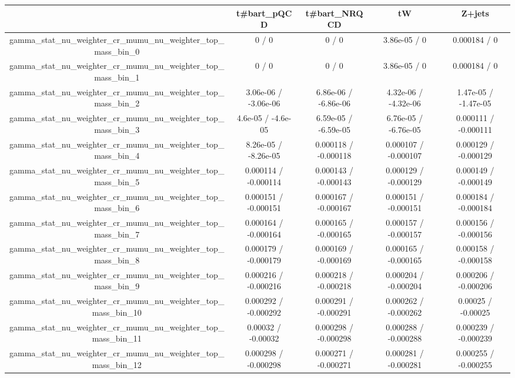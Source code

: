 \documentclass[10pt]{article}
\begin{document}
\begin{table}[htbp]
\begin{center}
\begin{tabular}{|c|c|c|c|c|}
\hline 
      & t#bar{t}_{pQCD}      & t#bar{t}_{NRQCD}      & tW      & Z+jets \\ 
\hline 
  gamma_stat_nu_weighter_cr_mumu_nu_weighter_top_mass_bin_0 & 0 / 0 & 0 / 0 & 3.86e-05 / 0 & 0.000184 / 0 \\ 
  gamma_stat_nu_weighter_cr_mumu_nu_weighter_top_mass_bin_1 & 0 / 0 & 0 / 0 & 3.86e-05 / 0 & 0.000184 / 0 \\ 
  gamma_stat_nu_weighter_cr_mumu_nu_weighter_top_mass_bin_2 & 3.06e-06 / -3.06e-06 & 6.86e-06 / -6.86e-06 & 4.32e-06 / -4.32e-06 & 1.47e-05 / -1.47e-05 \\ 
  gamma_stat_nu_weighter_cr_mumu_nu_weighter_top_mass_bin_3 & 4.6e-05 / -4.6e-05 & 6.59e-05 / -6.59e-05 & 6.76e-05 / -6.76e-05 & 0.000111 / -0.000111 \\ 
  gamma_stat_nu_weighter_cr_mumu_nu_weighter_top_mass_bin_4 & 8.26e-05 / -8.26e-05 & 0.000118 / -0.000118 & 0.000107 / -0.000107 & 0.000129 / -0.000129 \\ 
  gamma_stat_nu_weighter_cr_mumu_nu_weighter_top_mass_bin_5 & 0.000114 / -0.000114 & 0.000143 / -0.000143 & 0.000129 / -0.000129 & 0.000149 / -0.000149 \\ 
  gamma_stat_nu_weighter_cr_mumu_nu_weighter_top_mass_bin_6 & 0.000151 / -0.000151 & 0.000167 / -0.000167 & 0.000151 / -0.000151 & 0.000184 / -0.000184 \\ 
  gamma_stat_nu_weighter_cr_mumu_nu_weighter_top_mass_bin_7 & 0.000164 / -0.000164 & 0.000165 / -0.000165 & 0.000157 / -0.000157 & 0.000156 / -0.000156 \\ 
  gamma_stat_nu_weighter_cr_mumu_nu_weighter_top_mass_bin_8 & 0.000179 / -0.000179 & 0.000169 / -0.000169 & 0.000165 / -0.000165 & 0.000158 / -0.000158 \\ 
  gamma_stat_nu_weighter_cr_mumu_nu_weighter_top_mass_bin_9 & 0.000216 / -0.000216 & 0.000218 / -0.000218 & 0.000204 / -0.000204 & 0.000206 / -0.000206 \\ 
  gamma_stat_nu_weighter_cr_mumu_nu_weighter_top_mass_bin_10 & 0.000292 / -0.000292 & 0.000291 / -0.000291 & 0.000262 / -0.000262 & 0.00025 / -0.00025 \\ 
  gamma_stat_nu_weighter_cr_mumu_nu_weighter_top_mass_bin_11 & 0.00032 / -0.00032 & 0.000298 / -0.000298 & 0.000288 / -0.000288 & 0.000239 / -0.000239 \\ 
  gamma_stat_nu_weighter_cr_mumu_nu_weighter_top_mass_bin_12 & 0.000298 / -0.000298 & 0.000271 / -0.000271 & 0.000281 / -0.000281 & 0.000255 / -0.000255 \\ 

\end{tabular}
\end{center}
\end{table}
\end{document}
